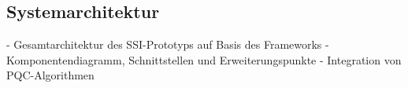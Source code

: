 \subsection{Systemarchitektur} \label{sec:Systemarchitektur}

- Gesamtarchitektur des SSI-Prototyps auf Basis des Frameworks
- Komponentendiagramm, Schnittstellen und Erweiterungspunkte
- Integration von PQC-Algorithmen